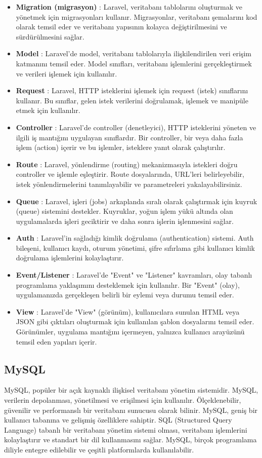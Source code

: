 \begin{itemize}
  \item \textbf{Migration (migrasyon)} : Laravel, veritabanı tablolarını oluşturmak ve yönetmek için migrasyonları kullanır. Migrasyonlar, veritabanı şemalarını kod olarak temsil eder ve veritabanı yapısının kolayca değiştirilmesini ve sürdürülmesini sağlar.
  \item \textbf{Model} : Laravel'de model, veritabanı tablolarıyla ilişkilendirilen veri erişim katmanını temsil eder. Model sınıfları, veritabanı işlemlerini gerçekleştirmek ve verileri işlemek için kullanılır.
  \item \textbf{Request} :  Laravel, HTTP isteklerini işlemek için request (istek) sınıflarını kullanır. Bu sınıflar, gelen istek verilerini doğrulamak, işlemek ve manipüle etmek için kullanılır.
  \item \textbf{Controller} : Laravel'de controller (denetleyici), HTTP isteklerini yöneten ve ilgili iş mantığını uygulayan sınıflardır. Bir controller, bir veya daha fazla işlem (action) içerir ve bu işlemler, isteklere yanıt olarak çalıştırılır.
  \item \textbf{Route} : Laravel, yönlendirme (routing) mekanizmasıyla istekleri doğru controller ve işlemle eşleştirir. Route dosyalarında, URL'leri belirleyebilir, istek yönlendirmelerini tanımlayabilir ve parametreleri yakalayabilirsiniz.
  \item \textbf{Queue} : Laravel, işleri (jobs) arkaplanda sıralı olarak çalıştırmak için kuyruk (queue) sistemini destekler. Kuyruklar, yoğun işlem yükü altında olan uygulamalarda işleri geciktirir ve daha sonra işlerin işlenmesini sağlar.
  \item \textbf{Auth} : Laravel'in sağladığı kimlik doğrulama (authentication) sistemi. Auth bileşeni, kullanıcı kaydı, oturum yönetimi, şifre sıfırlama gibi kullanıcı kimlik doğrulama işlemlerini kolaylaştırır.
  \item \textbf{Event/Listener} : Laravel'de "Event" ve "Listener" kavramları, olay tabanlı programlama yaklaşımını desteklemek için kullanılır. Bir "Event" (olay), uygulamanızda gerçekleşen belirli bir eylemi veya durumu temsil eder.
  \item \textbf{View} : Laravel'de "View" (görünüm), kullanıcılara sunulan HTML veya JSON gibi çıktıları oluşturmak için kullanılan şablon dosyalarını temsil eder. Görünümler, uygulama mantığını içermeyen, yalnızca kullanıcı arayüzünü temsil eden yapıları içerir.
\end{itemize}
\subsection{MySQL}
MySQL, popüler bir açık kaynaklı ilişkisel veritabanı yönetim sistemidir. MySQL, verilerin depolanması, yönetilmesi ve erişilmesi için kullanılır. Ölçeklenebilir, güvenilir ve performanslı bir veritabanı sunucusu olarak bilinir. MySQL, geniş bir kullanıcı tabanına ve gelişmiş özelliklere sahiptir. SQL (Structured Query Language) tabanlı bir veritabanı yönetim sistemi olması, veritabanı işlemlerini kolaylaştırır ve standart bir dil kullanmasını sağlar. MySQL, birçok programlama diliyle entegre edilebilir ve çeşitli platformlarda kullanılabilir.

